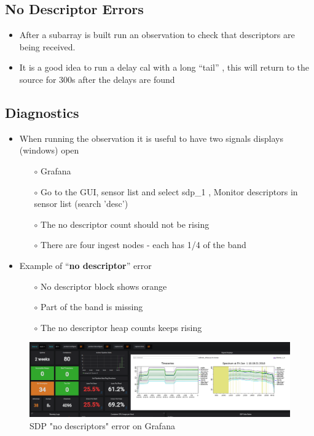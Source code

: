 \subsection{ No Descriptor Errors} 
\begin{itemize}
\item{} After a subarray is built run an observation to check that descriptors are being received.
\item{} It is a good idea to run a delay cal with a long “tail” , this will return to the source for 300s after the delays are found
\end{itemize}
\subsection{ Diagnostics}
\begin{itemize}
	\item{} When running the observation it is useful to have two signals displays (windows) open
	\begin{itemize}
		\item[$\circ$] Grafana
		  \item[$\circ$]    Go to the GUI, sensor list and select sdp\_1 , Monitor descriptors in sensor list (search 'desc')
		  \item[$\circ$] The no descriptor count should not be rising
		    
		  \item[$\circ$] There are four ingest nodes - each has 1/4 of the band   
		
	\end{itemize}
	




\item{} Example of “\textbf{no descriptor}” error
	\begin{itemize}
	\item[$\circ$] No descriptor block shows orange
\item[$\circ$] Part of the band is missing
\item[$\circ$] The no descriptor heap counts keeps rising
\end{itemize}
\end{itemize}



\begin{figure}[!thb]
	\centering
	\includegraphics[scale=0.2]{Chapters/images/image79.png}
	
	\caption{SDP "no descriptors" error on Grafana}
	\label{fig:image79}
\end{figure}

